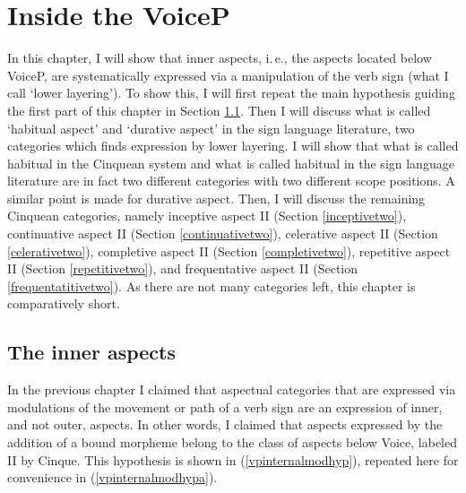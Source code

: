 \chapter{Inside the VoiceP}\label{insidevp}
In this chapter, I will show that inner aspects, i.\,e., the aspects located below VoiceP, are systematically expressed via a manipulation of the verb sign (what I call `lower layering'). To show this, I will first repeat the main hypothesis guiding the first part of this chapter in Section \ref{inneraspects}. Then I will discuss what is called `habitual aspect' and `durative aspect' in the sign language literature, two categories which finds expression by lower layering. I will show that what is called habitual in the Cinquean system and what is called habitual in the sign language literature are in fact two different categories with two different scope positions. A similar point is made for durative aspect. Then, I will discuss the remaining Cinquean categories, namely inceptive aspect II (Section \ref{inceptivetwo}), continuative aspect II (Section \ref{continuativetwo}), celerative aspect II (Section \ref{celerativetwo}), completive aspect II (Section \ref{completivetwo}), repetitive aspect II (Section \ref{repetitivetwo}), and frequentative aspect II (Section \ref{frequentatitivetwo}). As there are not many categories left, this chapter is comparatively short. 


\section{The inner aspects}\label{inneraspects}

In the previous chapter I claimed that aspectual categories that are expressed via modulations of the movement or path of a verb sign are an expression of inner, and not outer, aspects. In other words, I claimed that aspects expressed by the addition of a bound morpheme belong to the class of aspects below Voice, labeled II by Cinque. This hypothesis is shown in (\ref{vpinternalmodhyp}), repeated here for convenience in (\ref{vpinternalmodhypa}).

